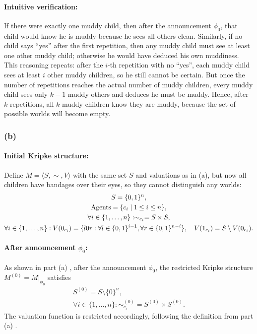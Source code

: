 \paragraph{Intuitive verification:} If there were exactly one muddy child, 
then after the announcement $\phi_0$, that child would know 
he is muddy because he sees all others clean. Similarly,
if no child says ``yes'' after the first repetition, 
then any muddy child must see at least one other muddy child; 
otherwise he would have deduced his own muddiness. 
This reasoning repeats: after the $i$-th repetition with no 
``yes'', each muddy child sees at least $i$ other muddy children, 
so he still cannot be certain. But once the number of 
repetitions reaches the actual number of muddy children, 
every muddy child sees only $k-1$ muddy others 
and deduces he must be muddy. Hence, after $k$ repetitions, 
all $k$ muddy children know they are muddy,
because the set of possible worlds will become empty.

\subsubsection*{(b)}

\paragraph*{Initial Kripke structure:}
Define \( M = \langle S, \sim, V \rangle \) with the same set \(S\) and 
valuations as in (a), but now all children have bandages over their eyes, 
so they cannot distinguish any worlds:
\begin{gather*}
    S = \{0,1\}^n, \\
    \text{Agents} = \{c_i \mid 1 \leq i \leq n\}, \\
    \forall i \in \{1,\dots,n\}: \sim_{c_i} = S \times S, \\
    \forall i \in \{1,\dots,n\}: 
        V(0_{c_i}) = \{ l0r : \forall l \in \{0,1\}^{i-1}, \forall r \in \{0,1\}^{n-i} \},\quad 
        V(1_{c_i}) = S \setminus V(0_{c_i}).
\end{gather*}

\paragraph*{After announcement $\phi_0$:}
As shown in part (a) , after the announcement $\phi_0$, 
the restricted Kripke structure \( M^{(0)} = M|_{\phi_0} \) satisfies
\begin{gather*}
    S^{(0)} = S \setminus \{0\}^n, \\
    \forall i \in \{1,\dots,n\}:
    \sim_{c_i}^{(0)} = S^{(0)} \times S^{(0)}. 
        \tag{1.2(b1)}\label{eq:1.2(b1)}
\end{gather*}
The valuation function is restricted accordingly, following the definition 
from part (a) .


